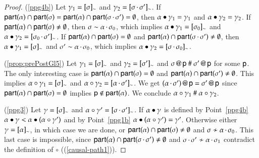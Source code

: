 \begin{proof}
   (\ref{ppg4b}) Let $\gamma_1=[\sigma]_{\sim}$ and
  $\gamma_2=[\sigma\,{\cdot}\,\sigma']_{\sim}$. If
  ${\sf part}(\alpha) \cap {\sf part}(\sigma)= {\sf part}(\alpha) \cap {\sf part}(\sigma\,{\cdot}\,\sigma')= \emptyset$, then 
  ${\alpha}\bullet{\ensuremath{\gamma}_1}=\gamma_1$ and ${\alpha}\bullet{\ensuremath{\gamma}_2}=\gamma_2$. If ${\sf part}(\alpha) \cap {\sf part}(\sigma) \neq
  \emptyset$, then $\sigma\sim\alpha\,{\cdot}\,\sigma_0$, which implies ${\alpha}\bullet{\ensuremath{\gamma}_1}=[\sigma_0]_{\sim}$ and ${\alpha}\bullet{\ensuremath{\gamma}_2}=[\sigma_0\,{\cdot}\,\sigma']_{\sim}$. If
  ${\sf part}(\alpha) \cap {\sf part}(\sigma)=\emptyset$ and ${\sf part}(\alpha) \cap {\sf part}(\sigma\,{\cdot}\,\sigma') \neq
  \emptyset$, then ${\alpha}\bullet{\ensuremath{\gamma}_1}=[\sigma]_{\sim}$ and $\sigma'\sim\alpha\,{\cdot}\,\sigma_0$, which implies ${\alpha}\bullet{\ensuremath{\gamma}_2}=[\sigma\,{\cdot}\,\sigma_0]_{\sim}$.
     
  
  (\ref{prop:prePostGl5}) Let $\gamma_1=[\sigma]_{\sim}$ and
  $\gamma_2=[\sigma']_{\sim}$ and $\sigma\,@\,{\sf p}~\#~\sigma'\,@\,{\sf p}$ for some ${\sf p}$. The only interesting case is  ${\sf part}(\alpha)\cap{\sf part}(\sigma)=\emptyset$ and  ${\sf part}(\alpha)\cap{\sf part}(\sigma')\not=\emptyset$. This implies ${\alpha}\circ{\ensuremath{\gamma}_1}=[\sigma]_{\sim}$ and  ${\alpha}\circ{\ensuremath{\gamma}_2}=[\alpha\,{\cdot}\,\sigma']_{\sim}$.
  We get $(\alpha\,{\cdot}\,\sigma')\,@\,{\sf p}=\sigma'\,@\,{\sf p}$ since ${\sf part}(\alpha)\cap{\sf part}(\sigma)=\emptyset$ implies ${\sf p}\not\in{\sf part}(\alpha)$. We conclude  ${\alpha}\circ{\ensuremath{\gamma}_1}~\#~ {\alpha}\circ{\ensuremath{\gamma}_2}$.
  
  (\ref{ppg3})  Let $\gamma=[\sigma]_{\sim}$ and ${\alpha}\circ{\ensuremath{\gamma}'}=[\sigma\,{\cdot}\,\sigma']_{\sim}$.
  If ${\alpha}\bullet{\ensuremath{\gamma}}$ is defined by Point~\ref{ppg4b}
  ${\alpha}\bullet{\ensuremath{\gamma}}<{\alpha}\bullet{(\ensuremath{{\alpha}\circ{\ensuremath{\gamma}'}})}$
  and by Point~\ref{ppg1b}
  ${\alpha}\bullet{(\ensuremath{{\alpha}\circ{\ensuremath{\gamma}'}})}=\gamma'$. Otherwise
  either $\gamma=[\alpha]_{\sim}$, in which case we are done, or 
  ${\sf part}(\alpha) \cap {\sf part}(\sigma) \neq
  \emptyset$ and $\sigma\not\sim\alpha\,{\cdot}\,\sigma_0$. 
  This last case is impossible, since ${\sf part}(\alpha) \cap {\sf part}(\sigma\,{\cdot}\,\sigma') \neq
  \emptyset$ and $\sigma\,{\cdot}\,\sigma'\not\sim\alpha\,{\cdot}\,\sigma_1$  contradict the definition of $\circ$ ((\ref{causal-path1})).

  
  

\end{proof}
